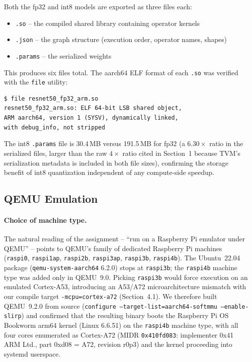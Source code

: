 \documentclass[11pt,a4paper]{article}
\begin{document}
Both the fp32 and int8 models are exported as three files each:
\begin{itemize}
  \item \texttt{.so} -- the compiled shared library containing operator kernels
  \item \texttt{.json} -- the graph structure (execution order, operator names, shapes)
  \item \texttt{.params} -- the serialized weights
\end{itemize}

This produces six files total. The aarch64 ELF format of each \texttt{.so} was verified with the \texttt{file} utility:

\begin{lstlisting}
$ file resnet50_fp32_arm.so
resnet50_fp32_arm.so: ELF 64-bit LSB shared object,
ARM aarch64, version 1 (SYSV), dynamically linked,
with debug_info, not stripped
\end{lstlisting}

The int8 \texttt{.params} file is 30.4\,MB versus 191.5\,MB for fp32 (a $6.30\times$ ratio in the serialized files, larger than the raw $4\times$ ratio cited in Section~1 because TVM's serialization metadata is included in both file sizes), confirming the storage benefit of int8 quantization independent of any compute-side speedup.

\subsection{QEMU Emulation}

\paragraph{Choice of machine type.} The natural reading of the assignment -- ``run on a Raspberry Pi emulator under QEMU'' -- points to QEMU's family of dedicated Raspberry Pi machines (\texttt{raspi0}, \texttt{raspi1ap}, \texttt{raspi2b}, \texttt{raspi3ap}, \texttt{raspi3b}, \texttt{raspi4b}). The Ubuntu~22.04 package (\texttt{qemu-system-aarch64} 6.2.0) stops at \texttt{raspi3b}; the \texttt{raspi4b} machine type was added only in QEMU~9.0. Picking \texttt{raspi3b} would force execution on an emulated Cortex-A53, introducing an A53/A72 microarchitecture mismatch with our compile target \texttt{-mcpu=cortex-a72} (Section~4.1). We therefore built QEMU~9.2.0 from source (\texttt{configure --target-list=\allowbreak aarch64-softmmu --enable-slirp}) and confirmed that the resulting binary boots the Raspberry Pi OS Bookworm arm64 kernel (Linux 6.6.51) on the \texttt{raspi4b} machine type, with all four cores enumerated as Cortex-A72 (MIDR \texttt{0x410fd083}: implementer 0x41 ARM Ltd., part 0xd08 = A72, revision r0p3) and the kernel proceeding into systemd userspace.
\end{document}
